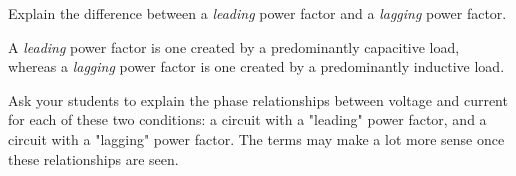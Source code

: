 

Explain the difference between a {\it leading} power factor and a {\it lagging} power factor.







A {\it leading} power factor is one created by a predominantly capacitive load, whereas a {\it lagging} power factor is one created by a predominantly inductive load.







Ask your students to explain the phase relationships between voltage and current for each of these two conditions: a circuit with a "leading" power factor, and a circuit with a "lagging" power factor.  The terms may make a lot more sense once these relationships are seen.




